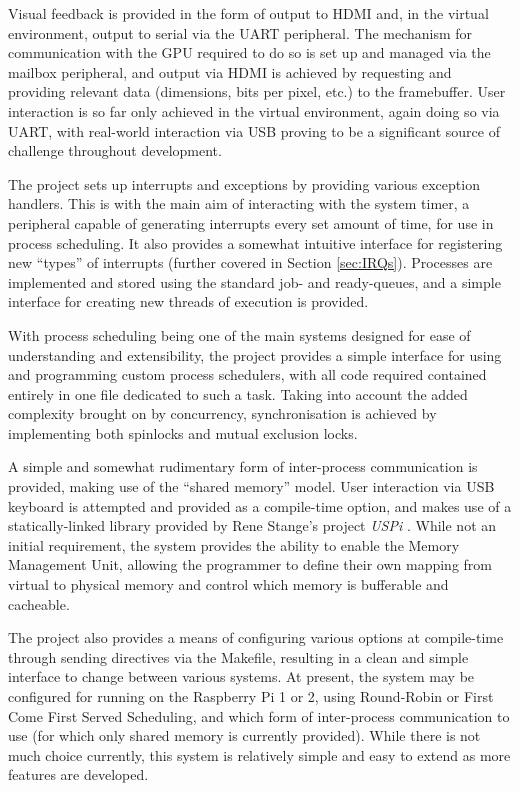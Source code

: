     Visual feedback is provided in the form of output to HDMI and, in the
    virtual environment, output to serial via the UART peripheral.  The
    mechanism for communication with the GPU required to do so is set up and
    managed via the mailbox peripheral, and output via HDMI is achieved by
    requesting and providing relevant data (dimensions, bits per pixel, etc.) to
    the framebuffer. User interaction is so far only achieved in the virtual
    environment, again doing so via UART, with real-world interaction via USB
    proving to be a significant source of challenge throughout development.

    The project sets up interrupts and exceptions by providing various exception
    handlers. This is with the main aim of interacting with the system timer, a
    peripheral capable of generating interrupts every set amount of time, for
    use in process scheduling. It also provides a somewhat intuitive interface
    for registering new ``types'' of interrupts (further covered in Section
    \ref{sec:IRQs}). Processes are implemented and stored using the standard
    job- and ready-queues, and a simple interface for creating new threads of
    execution is provided.

    With process scheduling being one of the main systems designed for ease of
    understanding and extensibility, the project provides a simple interface for
    using and programming custom process schedulers, with all code required
    contained entirely in one file dedicated to such a task.  Taking into
    account the added complexity brought on by concurrency, synchronisation is
    achieved by implementing both spinlocks and mutual exclusion locks.
    
    A simple and somewhat rudimentary form of inter-process communication is
    provided, making use of the ``shared memory'' model. User interaction via
    USB keyboard is attempted and provided as a compile-time option, and makes
    use of a statically-linked library provided by Rene Stange's project
    \textit{USPi} \cite{USPi}. While not an initial requirement, the system
    provides the ability to enable the Memory Management Unit, allowing the
    programmer to define their own mapping from virtual to physical memory and
    control which memory is bufferable and cacheable.

    The project also provides a means of configuring various options at
    compile-time through sending directives via the Makefile, resulting in a
    clean and simple interface to change between various systems. At present,
    the system may be configured for running on the Raspberry Pi 1 or 2, using
    Round-Robin or First Come First Served Scheduling, and which form of
    inter-process communication to use (for which only shared memory is
    currently provided). While there is not much choice currently, this system
    is relatively simple and easy to extend as more features are developed.


